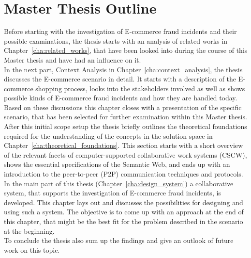 
\section{Master Thesis Outline}
\label{sec:thesis_outline}

Before starting with the investigation of \gls{E-commerce} fraud incidents and their possible examinations, the thesis starts with an analysis of related works in Chapter~\ref{cha:related_works}, that have been looked into during the course of this Master thesis and have had an influence on it. \\

In the next part, Context Analysis in Chapter~\ref{cha:context_analysis}, the thesis discusses the \gls{E-commerce} scenario in detail. It starts with a description of the \gls{E-commerce} shopping process, looks into the stakeholders involved as well as shows possible kinds of \gls{E-commerce} fraud incidents and how they are handled today. Based on these discussions this chapter closes with a presentation of the specific scenario, that has been selected for further examination within this Master thesis. \\

After this initial scope setup the thesis briefly outlines the theoretical foundations required for the understanding of the concepts in the solution space in Chapter~\ref{cha:theoretical_foundations}. This section starts with a short overview of the relevant facets of computer-supported collaborative work systems (\gls{CSCW}), shows the essential specifications of the Semantic Web, and ends up with an introduction to the peer-to-peer (\gls{P2P}) communication techniques and protocols. \\

In the main part of this thesis (Chapter~\ref{cha:design_system}) a collaborative system, that supports the investigation of \gls{E-commerce} fraud incidents, is developed. This chapter lays out and discusses the possibilities for designing and using such a system. The objective is to come up with an approach at the end of this chapter, that might be the best fit for the problem described in the scenario at the beginning. \\

To conclude the thesis also sum up the findings and give an outlook of future work on this topic.

